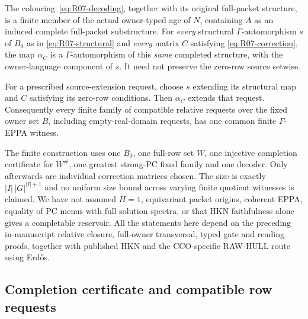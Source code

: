 \begin{theorem}
\label{thm:R07-relative-eppa}
The colouring~\eqref{eq:R07-decoding}, together with its
original full-packet structure, is a finite member of the
actual owner-typed age of $N$, containing $A$ as an induced
complete full-packet substructure. For \emph{every} structural
$\Gamma$-automorphism $s$ of $B_0$ as in
\eqref{eq:R07-structural} and \emph{every} matrix $C$ satisfying
\eqref{eq:R07-correction}, the map $\alpha_C$ is a
$\Gamma$-automorphism of this \emph{same} completed structure,
with the owner-language component of $s$. It need not preserve
the zero-row source setwise.

For a prescribed source-extension request, choose $s$ extending
its structural map and $C$ satisfying its zero-row conditions.
Then $\alpha_C$ extends that request. Consequently every finite
family of compatible relative requests over the fixed owner set
$B$, including empty-real-domain requests, has one common finite
$\Gamma$-EPPA witness.
\end{theorem}

\begin{remark}
\label{rem:R07-scope}
The finite construction uses one $B_0$, one full-row set $W$,
one injective completion certificate for $W^\#$, one greatest
strong-PC fixed family and one decoder.  Only afterwards are
individual correction matrices chosen.  The size is exactly
$|I|\,|G|^{|I|+1}$ and no uniform size bound across varying
finite quotient witnesses is claimed.  We have not assumed
$H=1$, equivariant packet origins, coherent EPPA, equality of PC
menus with full solution spectra, or that HKN faithfulness alone
gives a completable reservoir.  All the statements here depend
on the preceding in-manuscript relative closure, full-owner
transversal, typed gate and reading proofs, together with
published HKN and the CCO-specific RAW-HULL route using Erd\H{o}s.
\end{remark}

\subsection{Completion certificate and compatible row requests}

